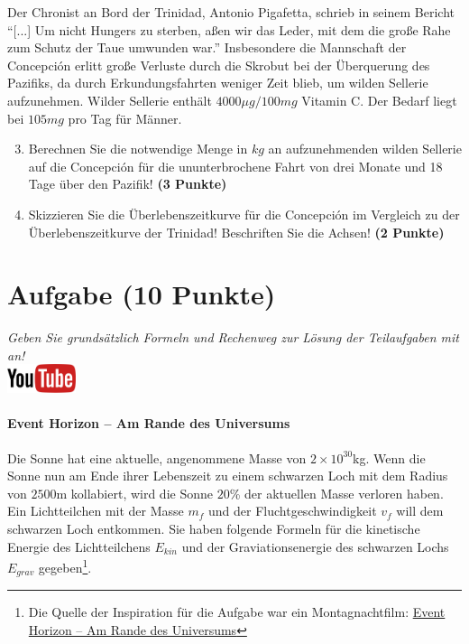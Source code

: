 \documentclass[a4paper, 9pt]{scrartcl}\usepackage[]{graphicx}\usepackage[]{xcolor}
\begin{document}
Der Chronist an Bord der Trinidad, Antonio Pigafetta, schrieb in seinem
Bericht "`[...] Um nicht Hungers zu sterben, a{\ss}en wir das Leder, mit dem
die gro{\ss}e Rahe zum Schutz der Taue umwunden war."' Insbesondere die
Mannschaft der Concepci{\'o}n erlitt gro{\ss}e Verluste durch die Skrobut bei der
{\"U}berquerung des Pazifiks, da durch Erkundungsfahrten weniger Zeit blieb, um
wilden Sellerie aufzunehmen. Wilder Sellerie enth{\"a}lt
$4000\mu g/100mg$ Vitamin C. Der Bedarf liegt bei
$105mg$ pro Tag f{\"u}r M{\"a}nner.

\begin{enumerate}
  \setcounter{enumi}{2}
\item Berechnen Sie die notwendige Menge in $kg$ an
  aufzunehmenden wilden Sellerie auf die Concepci{\'o}n f{\"u}r die ununterbrochene
  Fahrt von drei Monate und 18 Tage {\"u}ber den Pazifik!
  \textbf{(3 Punkte)}
\item Skizzieren Sie die {\"U}berlebenszeitkurve f{\"u}r die Concepci{\'o}n im
  Vergleich zu der {\"U}berlebenszeitkurve der Trinidad! Beschriften Sie die
  Achsen! \textbf{(2 Punkte)}
\end{enumerate}

 
\clearpage

\section{Aufgabe \hfill (10 Punkte)}

\textit{Geben Sie grunds{\"a}tzlich Formeln und Rechenweg zur L{\"o}sung der
  Teilaufgaben mit an!} \\[1Ex]

\hfill\href{https://youtu.be/q-qYK4Chslg}{\includegraphics[width =
  2cm]{img/youtube}} %
\hspace{2Ex}

\paragraph{Event Horizon -- Am Rande des Universums}



Die Sonne hat eine aktuelle, angenommene Masse von $\ensuremath{2\times 10^{30}}$kg. Wenn
die Sonne nun am Ende ihrer Lebenszeit zu einem schwarzen Loch mit dem
Radius von $2500$m kollabiert, wird die Sonne $20$\%
der aktuellen Masse verloren haben. Ein Lichtteilchen mit der Masse $m_f$
und der Fluchtgeschwindigkeit $v_f$ will dem schwarzen Loch entkommen.  Sie
haben folgende Formeln f{\"u}r die kinetische Energie des Lichtteilchens
$E_{kin}$ und der Graviationsenergie des schwarzen Lochs $E_{grav}$
gegeben\footnote{Die Quelle der Inspiration
  für die Aufgabe war ein Montagnachtfilm:
  \href{https://de.wikipedia.org/wiki/Event_Horizon_–_Am_Rande_des_Universums}{Event Horizon – Am Rande des Universums}}.
\end{document}
